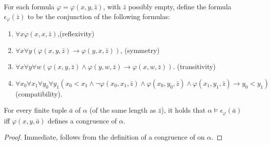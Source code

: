 \begin{prp}\label{prp:dcform}
	For each formula $\varphi=\varphi(x,y,\bar{z})$, with $\bar{z}$ possibly
	empty, define the formula $\epsilon_\varphi(\bar{z})$ to be the conjunction
	of the following formulas:
	\begin{enumerate}
		\item	$\forall x\varphi(x,x,\bar{z})$,\hfill(reflexivity)
		\item	$\forall x\forall
			y(\varphi(x,y,\bar{z})\rightarrow\varphi(y,x,\bar{z}))$,\hfill
			(symmetry)
		\item 	$\forall x\forall y\forall
			w(\varphi(x,y,\bar{z})\wedge\varphi(y,w,\bar{z})\rightarrow\varphi(x,w,\bar{z}))$.\hfill
			(transitivity)
		\item 	$\forall x_0\forall x_1\forall y_0\forall
			y_1(x_0<x_1\wedge\neg\varphi(x_0,x_1,\bar{z})\wedge\varphi(x_0,y_0,\bar{z})
			\wedge\varphi(x_1,y_1,\bar{z})\rightarrow
			y_0<y_1)$\phantom{}\hfill(compatibility).
	\end{enumerate}
	For every finite tuple $\bar{a}$ of $\alpha$ (of the same length as
	$\bar{z}$), it holds that $\alpha\models\epsilon_\varphi(\bar{a})$ iff
	$\varphi(x,y,\bar{a})$ defines a congruence of $\alpha$.
\end{prp}
\begin{proof}
	Immediate, follows from the definition of a congruence of on $\alpha$.
\end{proof}

